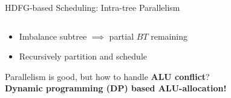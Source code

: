 \documentclass{beamer}
\begin{document}
\begin{CJK}{UTF8}{bkai}
\begin{frame}{HDFG-based Scheduling: Intra-tree Parallelism}
\begin{columns}
\begin{column}{0.6\textwidth}
\begin{itemize}
                        \item {Imbalance subtree $\implies$ partial $BT$ remaining}
                        \pause
                        \item {Recursively partition and schedule}
                        \end{itemize} 
                        \pause
                        \vspace{1em} 
                        Parallelism is good, but how to handle \textbf{ALU conflict}?\\
                        \pause
                        \vspace{1em} 
                        \centering
                        {\large{\textbf{Dynamic programming (DP) based ALU-allocation!}}}
                    \end{column}
                \end{columns}
            \end{frame}


\end{CJK}
\end{document}
